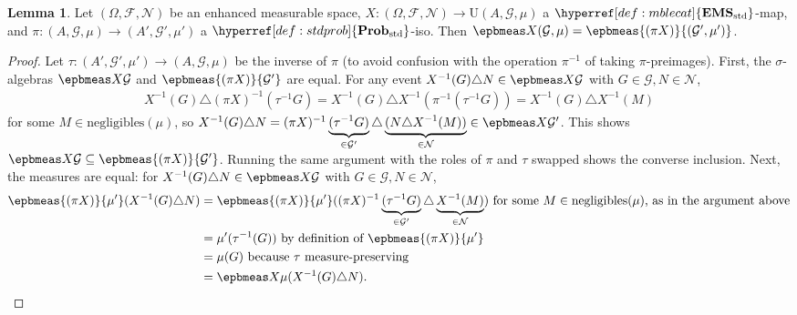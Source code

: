 \documentclass[
  sigconf,
  screen, ]{acmart}
\theoremstyle{definition}
\newtheorem{lemma}[theorem]{Lemma}
\newcommand\calF{\mathcal F}
\newcommand\calG{\mathcal G}
\newcommand\calN{\mathcal N}
\newcommand\nref[2]{\hyperref[#1]{#2}} \newcommand\checkhigh{{\huge{\color{red}\textbf{TODO: check}}}}
\newcommand\negligibles{\mathrm{negligibles}}
\newcommand\texforgetmu{\mathrm{U}}
\newcommand\forgetmu{{\nref{def:forgetmu}{\texforgetmu}}}
\newcommand\texStdProb{\mathbf{Prob}_{\rm std}}
\newcommand\StdProb{{\nref{def:stdprob}{\texStdProb}}}
\newcommand\texStdMble{\mathbf{EMS}_{\rm std}}
\newcommand\StdMble{{\nref{def:mblecat}{\texStdMble}}}
\begin{document}
\begin{lemma} \label{app:lem:epb-resp-iso}
  Let $(\Omega,\calF,\calN)$
  be an enhanced measurable space,
  $X : (\Omega,\calF,\calN)\to\forgetmu(A,\calG,\mu)$
  a $\StdMble$-map,
  and $\pi : (A,\calG,\mu)\to(A',\calG',\mu')$
  a $\StdProb$-iso.
  Then $\epbmeas X{(\calG,\mu)}
  =\epbmeas{(\pi X)}{({\calG'}, {\mu'})}$.
\end{lemma}
\begin{proof}
  Let $\tau : (A',\calG',\mu')\to(A,\calG,\mu)$ be the inverse of $\pi$
  (to avoid confusion with the operation $\pi^{-1}$ of taking $\pi$-preimages).
  First, the $\sigma$-algebras $\epbmeas X\calG$ and $\epbmeas{(\pi X)}{\calG'}$
  are equal.
  For any event $X^{-1}(G)\triangle N\in \epbmeas X\calG$
  with $G\in\calG,N\in\calN$,
  \begin{align*}
    X^{-1}(G) \triangle (\pi X)^{-1}(\tau^{-1} G)
    = X^{-1}(G)\triangle X^{-1}(\pi^{-1}(\tau^{-1} G)) 
    = X^{-1}(G)\triangle X^{-1}(M)
  \end{align*}
  for some $M\in\negligibles(\mu)$,
  so $X^{-1}(G)\triangle N 
  = (\pi X)^{-1}\underbrace{(\tau^{-1}G)}_{\in\calG'}\triangle 
  \underbrace{(N\triangle X^{-1}(M))}_{\in\calN} \in \epbmeas X{\calG'}$.
  This shows $\epbmeas X\calG\subseteq\epbmeas{(\pi X)}{\calG'}$.
  Running the same argument with the roles of $\pi$ and $\tau$ swapped
  shows the converse inclusion.
  Next, the measures are equal:
  for $X^{-1}(G)\triangle N\in \epbmeas X\calG$
  with $G\in\calG,N\in\calN$,
  \begin{align*}
    \epbmeas {(\pi X)}{\mu'}(X^{-1}(G)\triangle N)
    &= \epbmeas {(\pi X)}{\mu'}((\pi X)^{-1}\underbrace{(\tau^{-1}G)}_{\in\calG'}\triangle \underbrace{X^{-1}(M)}_{\in \calN})
      \text{ for some $M\in\negligibles(\mu)$, as in the argument above} \\
    &= \mu'(\tau^{-1}(G)) \text{ by definition of $\epbmeas{(\pi X)}{\mu'}$}\\
    &= \mu(G) \text{ because $\tau$ measure-preserving}\\
    &=\epbmeas X\mu(X^{-1}(G)\triangle N).
  \end{align*}
\end{proof}
\end{document}
